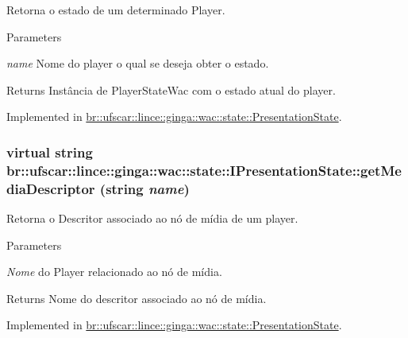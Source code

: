 Retorna o estado de um determinado Player. 


\begin{DoxyParams}{Parameters}
\item[{\em name}]Nome do player o qual se deseja obter o estado. \end{DoxyParams}
\begin{DoxyReturn}{Returns}
Instância de PlayerStateWac com o estado atual do player. 
\end{DoxyReturn}


Implemented in \hyperlink{classbr_1_1ufscar_1_1lince_1_1ginga_1_1wac_1_1state_1_1PresentationState_a460f75f353ea3508dacdbd2a29bd537e}{br::ufscar::lince::ginga::wac::state::PresentationState}.

\hypertarget{classbr_1_1ufscar_1_1lince_1_1ginga_1_1wac_1_1state_1_1IPresentationState_a4a8d2526ea16319ea1efc19928ffe028}{
\subsubsection[{getMediaDescriptor}]{\setlength{\rightskip}{0pt plus 5cm}virtual string br::ufscar::lince::ginga::wac::state::IPresentationState::getMediaDescriptor (string {\em name})}}
\label{classbr_1_1ufscar_1_1lince_1_1ginga_1_1wac_1_1state_1_1IPresentationState_a4a8d2526ea16319ea1efc19928ffe028}


Retorna o Descritor associado ao nó de mídia de um player. 


\begin{DoxyParams}{Parameters}
\item[{\em Nome}]do Player relacionado ao nó de mídia. \end{DoxyParams}
\begin{DoxyReturn}{Returns}
Nome do descritor associado ao nó de mídia. 
\end{DoxyReturn}


Implemented in \hyperlink{classbr_1_1ufscar_1_1lince_1_1ginga_1_1wac_1_1state_1_1PresentationState_a5f3306aca36ba9aac7c43d27f6f29ad9}{br::ufscar::lince::ginga::wac::state::PresentationState}.

